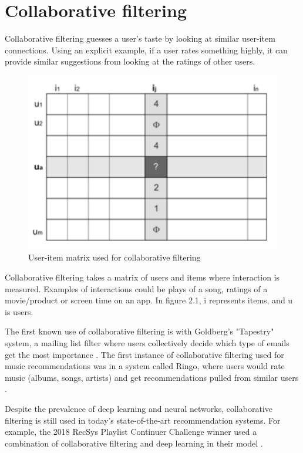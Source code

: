 \section{Collaborative filtering}

Collaborative filtering guesses a user's taste by looking at similar user-item connections. Using an explicit example, if a user rates something highly, it can provide similar suggestions from looking at the ratings of other users\citep{celma_recommendation_2010}.

\begin{figure}[H]
	\includegraphics[scale=0.65]{images/collaborative_filtering}
	\centering
	\caption{User-item matrix used for collaborative filtering \citep{celma_recommendation_2010}} 
	\label{fig:figure}
\end{figure}

Collaborative filtering takes a matrix of users and items where interaction is measured. Examples of interactions could be plays of a song, ratings of a movie/product or screen time on an app. In figure 2.1, i represents items, and u is users.

The first known use of collaborative filtering is with Goldberg's "Tapestry" system, a mailing list filter where users collectively decide which type of emails get the most importance \citep{goldberg_using_1992}. The first instance of collaborative filtering used for music recommendations was in a system called Ringo, where users would rate music (albums, songs, artists) and get recommendations pulled from similar users \citep{shardanand_social_1995}. 

Despite the prevalence of deep learning and neural networks, collaborative filtering is still used in today's state-of-the-art recommendation systems. For example, the 2018  RecSys Playlist Continuer Challenge winner used a combination of collaborative filtering and deep learning in their model \citep{volkovs_two-stage_2018}.

